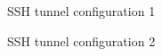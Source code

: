 \begin{figure}[htbp]
		\centering
	\caption{SSH tunnel configuration 1}
	\label{fig:putty1}
\end{figure}

\begin{figure}[htbp]
		\centering
	\caption{SSH tunnel configuration 2}
	\label{fig:putty2}
\end{figure}

